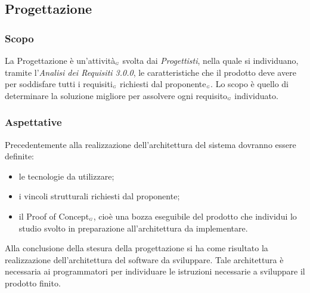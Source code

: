 \subsection{Progettazione}\label{ProcessiPrimariProgettazione}
\subsubsection{Scopo}\label{ProcessiPrimariProgettazioneScopo}
La Progettazione è un'attività$_{\scaleto{G}{3pt}}$ svolta dai \textit{Progettisti}, nella quale si individuano, tramite l'\textit{Analisi dei Requisiti 3.0.0}, le caratteristiche che il prodotto deve avere per soddisfare tutti i requisiti$_{\scaleto{G}{3pt}}$ richiesti dal proponente$_{\scaleto{G}{3pt}}$. Lo scopo è quello di determinare la soluzione migliore per assolvere ogni requisito$_{\scaleto{G}{3pt}}$ individuato.
\subsubsection{Aspettative}\label{ProcessiPrimariProgettazioneAspettative}
Precedentemente alla realizzazione dell'architettura del sistema dovranno essere definite:
\begin{itemize}
	\item le tecnologie da utilizzare;
	\item i vincoli strutturali richiesti dal proponente;
	\item il Proof of Concept$_{\scaleto{G}{3pt}}$, cioè una bozza eseguibile del prodotto che individui lo studio svolto in preparazione all'architettura da implementare.
\end{itemize}
Alla conclusione della stesura della progettazione si ha come risultato la realizzazione dell'architettura del software da sviluppare. Tale architettura è necessaria ai programmatori per individuare le istruzioni necessarie a sviluppare il prodotto finito.
